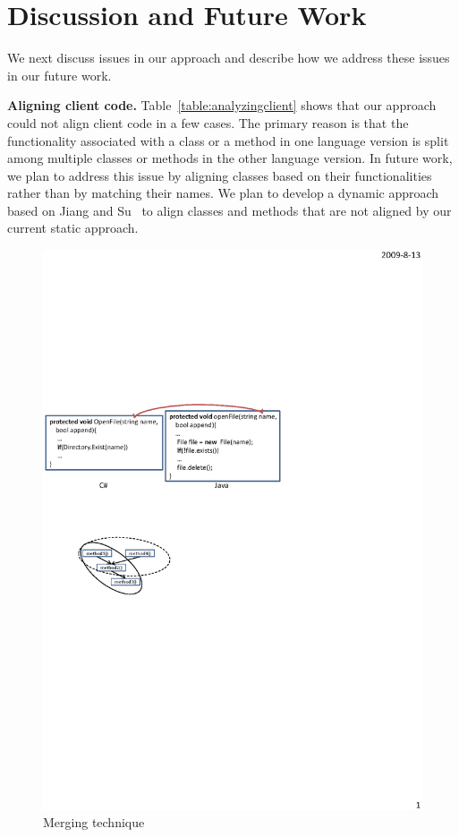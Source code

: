 \section{Discussion and Future Work}
\label{sec:discuss} 

We next discuss issues in our approach and describe how we address
these issues in our future work.

\textbf{Aligning client code.} Table~\ref{table:analyzingclient} shows that our approach could not
align client code in a few cases. The primary reason is that
the functionality associated with a class or a method in one language
version is split among multiple classes or methods in the other language
version. In future work, we plan to address this issue by aligning
classes based on their functionalities rather than by matching their names.
We plan to develop a dynamic approach based on Jiang and Su~\cite{jiang2009automatic}
to align classes and methods that are not aligned by our current static approach.

\begin{figure}[t]
\centering
\includegraphics[scale=1,clip]{figure/n2n.eps}\vspace*{-3ex}
 \caption{Merging technique}\vspace*{-3.5ex}
 \label{fig:n2n}
\end{figure}

